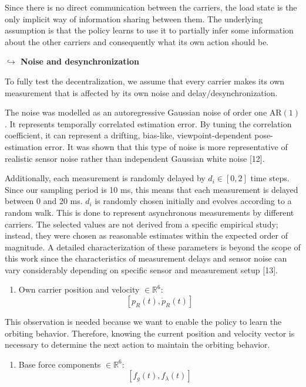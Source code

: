  Since there is no direct communication between the carriers, the load
state is the only implicit way of information sharing between them. The
underlying assumption is that the policy learns to use it to partially
infer some information about the other carriers and consequently what
its own action should be.

\noindent\textbf{$\hookrightarrow$ Noise and desynchronization}

To fully test the decentralization, we assume that every carrier makes
its own measurement that is affected by its own noise and
delay/desynchronization.

The noise was modelled as an autoregressive Gaussian noise of order one
$\mathrm{AR}(1)$. It represents temporally correlated estimation error.
By tuning the correlation coefficient, it can represent a drifting,
bias-like, viewpoint-dependent pose-estimation error. It was shown that
this type of noise is more representative of realistic sensor noise
rather than independent Gaussian white noise [12].

Additionally, each measurement is randomly delayed by $d_i \in [0, 2]$
time steps. Since our sampling period is 10 ms, this means that each
measurement is delayed between 0 and 20 ms. $d_i$ is randomly chosen
initially and evolves according to a random walk. This is done to
represent asynchronous measurements by different carriers. The selected
values are not derived from a specific empirical study; instead, they
were chosen as reasonable estimates within the expected order of
magnitude. A detailed characterization of these parameters is beyond the
scope of this work since the characteristics of measurement delays and
sensor noise can vary considerably depending on specific sensor and
measurement setup [13].

\begin{enumerate}[resume]
  \item Own carrier position and velocity $\in \mathbb{R}^6$:
  \[
    [p_R(t), \dot{p}_R(t)]
  \]
\end{enumerate}

This observation is needed because we want to enable the policy to learn
the orbiting behavior. Therefore, knowing the current position and
velocity vector is necessary to determine the next action to maintain
the orbiting behavior.

\newpage
\begin{enumerate}[resume]
  \item Base force components $\in \mathbb{R}^6$:
  \[
    [f_g(t), f_\lambda(t)]
  \]
\end{enumerate}

